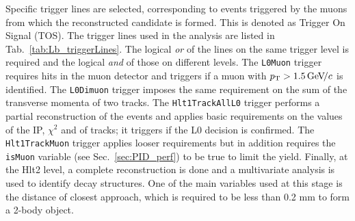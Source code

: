Specific trigger lines are selected, corresponding to events triggered by the muons
from which the reconstructed candidate is formed. This is denoted as Trigger On Signal (TOS).
The trigger lines used in the analysis are listed in Tab.~\ref{tab:Lb_triggerLines}.
The logical {\em or } of the lines on the same trigger level is required and the logical {\em and}
of those on different levels.
The \verb!L0Muon! trigger requires hits in the muon detector and triggers if a muon with $\mbox{$p_{\rm T}$} > 1.5 {\mathrm{\,Ge\kern -0.1em V\!/}c}$ is identified.
The \verb!L0Dimuon! trigger imposes the same requirement on the sum of the transverse momenta of two tracks.
The \verb!Hlt1TrackAllL0! trigger performs a partial reconstruction of the events and applies basic requirements on the
values of the IP, $\chi^2$ and \pt of tracks; it triggers if the L0 decision is confirmed. The \verb!Hlt1TrackMuon! trigger applies looser requirements 
but in addition requires the \verb!isMuon! variable (see Sec.~\ref{sec:PID_perf}) to be true to limit the yield.
Finally, at the Hlt2 level, a complete reconstruction is done and a multivariate analysis is used to identify decay 
structures. One of the main variables used at this stage is the distance of closest approach, which is 
required to be less than 0.2 mm to form a 2-body object.
%
\begin{table}[h]
\centering
\caption{Summary of the trigger lines used to select events at various levels.
Trigger is always required to be due to the tracks of the candidate itself.}
\label{tab:Lb_triggerLines}
\end{table}
%


